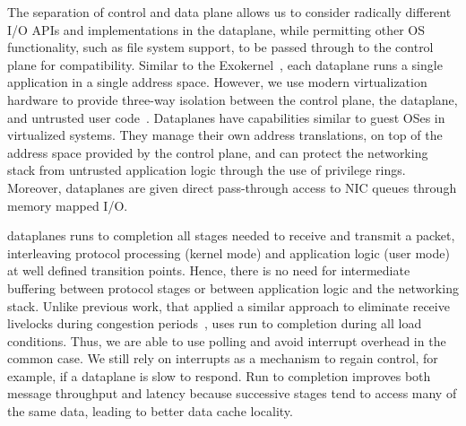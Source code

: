 The separation of control and data plane allows us to consider
radically different I/O APIs and implementations in the dataplane,
while permitting other OS functionality, such as file system support,
to be passed through to the control plane for compatibility.
Similar to the Exokernel~\cite{DBLP:conf/sosp/EnglerKO95}, each
dataplane runs a single application in a single address
space. However, we use modern virtualization hardware to provide
three-way isolation between the control plane, the dataplane, and
untrusted user code~\cite{dune}. Dataplanes have capabilities similar
to guest OSes in virtualized systems. They manage their own address
translations, on top of the address space provided by the control
plane, and can protect the networking stack from untrusted application
logic through the use of privilege rings. Moreover, dataplanes are
given direct pass-through access to NIC queues through memory mapped
I/O.



 \ix dataplanes
runs to completion all stages needed to receive and transmit a packet,
interleaving protocol processing (kernel mode) and application logic
(user mode) at well defined transition points. Hence, there is no need
for intermediate buffering between protocol stages or between
application logic and the networking stack.  Unlike previous work, that
applied a similar approach to eliminate receive livelocks during
congestion periods~\cite{receive-livelock}, \ix uses run to completion
during all load conditions. Thus, we are able to use polling and avoid
interrupt overhead in the common case. We still rely on interrupts as
a mechanism to regain control, for example, if a dataplane is slow to
respond.  Run to completion improves both message throughput and
latency because successive stages tend to access many of the same
data, leading to better data cache locality.

